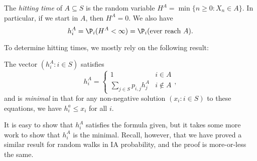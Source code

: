 \documentclass[a4paper]{article}
\begin{document}
\begin{defi}
  The \emph{hitting time} of $A \subseteq S$ is the random variable $H^A = \min\{n \geq 0: X_n \in A\}$. In particular, if we start in $A$, then $H^A = 0$. We also have
  \[
    h_i^A = \P_i(H^A < \infty) = \P_i(\text{ever reach }A).
  \]
\end{defi}

To determine hitting times, we mostly rely on the following result:
\begin{thm}
  The vector $(h_i^A: i \in S)$ satisfies
  \[
    h_i^A =
    \begin{cases}
      1 & i \in A\\
      \sum_{j \in S}p_{i, j}h_j^A & i \not \in A
    \end{cases},
  \]
  and is \emph{minimal} in that for any non-negative solution $(x_i: i \in S)$ to these equations, we have $h_i^a \leq x_i$ for all $i$.
\end{thm}
It is easy to show that $h_i^A$ satisfies the formula given, but it takes some more work to show that $h_i^A$ is the minimal. Recall, however, that we have proved a similar result for random walks in IA probability, and the proof is more-or-less the same.
\end{document}
